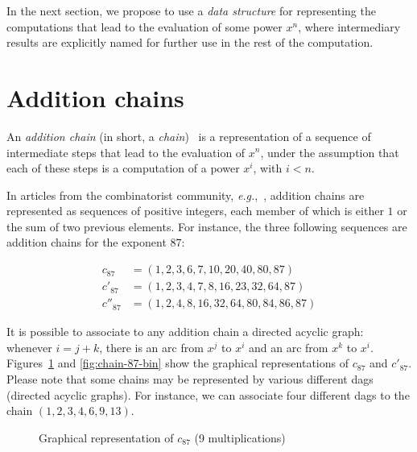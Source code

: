 In the next section, we propose to use a \emph{data structure} for representing 
the computations that lead to the evaluation of some power $x^n$, where
intermediary results are explicitly named for further use in the rest of the computation.




\section{Addition chains}
An \emph{addition chain} (in short, a \emph{chain})~\cite{brauer1939} is a representation of a sequence of
intermediate steps that lead to the evaluation of  $x^n$, under the 
assumption that each of these steps is a computation of  a power $x^i$, with 
$i<n$.

In articles from the combinatorist  community, 
\emph{e.g.},~\cite{brauer1939,DBLP:journals/ipl/BerstelB87},  addition chains
are represented as sequences of positive integers, each member of which 
is either $1$ or  the sum of two previous elements.
For instance, the three following sequences are addition chains for the exponent $87$:

\begin{align}
c_{87} &= (1,2,3,6,7,10,20,40,80,87) \\
c'_{87}&=(1,2,3,4,7,8,16,23,32,64,87) \\
c''_{87}&=(1,2,4,8,16,32,64,80,84,86,87)
\end{align}

It is possible to associate to any addition chain a directed acyclic graph:
whenever $i=j+k$, there is an arc from $x^j$ to $x^i$ and an arc
from $x^k$ to $x^i$. Figures~\ref{fig:chain-87-eucl}  and 
\ref{fig:chain-87-bin} show the graphical representations of 
 $c_{87}$  and $c'_{87}$. 
Please note that some chains may be represented by various different dags (directed acyclic graphs).
For instance, we can associate four different dags to the chain $(1,2,3,4,6,9,13)$. 


\begin{figure}[h]
  \centering
  
  \caption{Graphical representation of $c_{87}$ (9 multiplications)}
  \label{fig:chain-87-eucl}
\end{figure}


